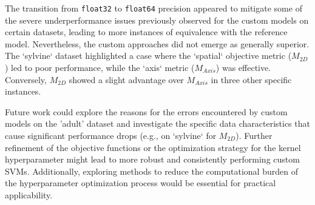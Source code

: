 \documentclass[conference]{IEEEtran} %
\begin{document}
The transition from \texttt{float32} to \texttt{float64} precision appeared to mitigate some of the severe underperformance issues previously observed for the custom models on certain datasets, leading to more instances of equivalence with the reference model. Nevertheless, the custom approaches did not emerge as generally superior. The `sylvine` dataset highlighted a case where the `spatial` objective metric ($M_{2D}$) led to poor performance, while the `axis` metric ($M_{Axis}$) was effective. Conversely, $M_{2D}$ showed a slight advantage over $M_{Axis}$ in three other specific instances.

Future work could explore the reasons for the errors encountered by custom models on the 'adult' dataset and investigate the specific data characteristics that cause significant performance drops (e.g., on `sylvine` for $M_{2D}$). Further refinement of the objective functions or the optimization strategy for the kernel hyperparameter might lead to more robust and consistently performing custom SVMs. Additionally, exploring methods to reduce the computational burden of the hyperparameter optimization process would be essential for practical applicability.


\end{document}

